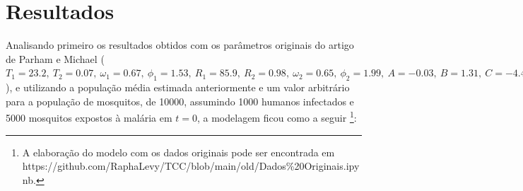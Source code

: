 \documentclass[12pt]{article}
\begin{document}
\section{Resultados}

Analisando primeiro os resultados obtidos com os parâmetros originais 
do artigo de Parham e Michael ($T_1=23.2, \ T_2=0.07, \ \omega_1=0.67, 
\ \phi_1=1.53, \ R_1=85.9, \ R_2=0.98, \ \omega_2=0.65, \ \phi_2=1.99, 
\ A=-0.03, \ B=1.31, \ C=-4.4, \ b_1=0.04, \ b_2 = 0.09, \ T_{min}=14.5, 
\ \gamma= 1/120,\ R_L = 50, \ c_1=0.00554, \ c_2=-0.06737 ^{[8], [17]}$), 
e utilizando a população média estimada anteriormente e um valor arbitrário 
para a população de mosquitos, de 10000, assumindo 1000 humanos infectados 
e 5000 mosquitos expostos à malária em $t=0$, a modelagem ficou como a seguir 
\footnote{A elaboração do modelo com os dados originais pode ser encontrada em
https://github.com/RaphaLevy/TCC/blob/main/old/Dados\%20Originais.ipynb.}: 


\end{document}
